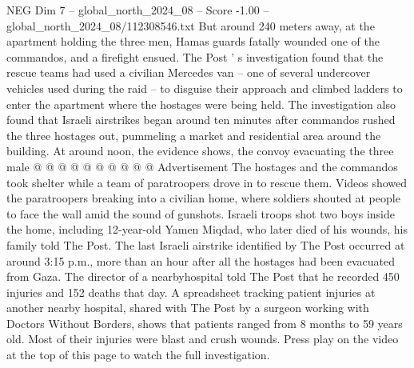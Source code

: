 \begin{textsample}{NEG Dim 7 – global\_north\_2024\_08 – Score -1.00 – global\_north\_2024\_08/112308546.txt}
But around 240 meters away, at the apartment holding the three men, Hamas guards fatally wounded one of the commandos, and a firefight ensued.
The Post ' s investigation found that the rescue teams had used a civilian Mercedes van -- one of several undercover vehicles used during the raid -- to disguise their approach and climbed ladders to enter the apartment where the hostages were being held.
The investigation also found that Israeli airstrikes began around ten minutes after commandos rushed the three hostages out, pummeling a market and residential area around the building.
At around noon, the evidence shows, the convoy evacuating the three male @ @ @ @ @ @ @ @ @ @ Advertisement The hostages and the commandos took shelter while a team of paratroopers drove in to rescue them.
Videos showed the paratroopers breaking into a civilian home, where soldiers shouted at people to face the wall amid the sound of gunshots.
Israeli troops shot two boys inside the home, including 12-year-old Yamen Miqdad, who later died of his wounds, his family told The Post.
The last Israeli airstrike identified by The Post occurred at around 3:15 p.m., more than an hour after all the hostages had been evacuated from Gaza.
The director of a nearbyhospital told The Post that he recorded 450 injuries and 152 deaths that day.
A spreadsheet tracking patient injuries at another nearby hospital, shared with The Post by a surgeon working with Doctors Without Borders, shows that patients ranged from 8 months to 59 years old.
Most of their injuries were blast and crush wounds.
Press play on the video at the top of this page to watch the full investigation.

\end{textsample}
